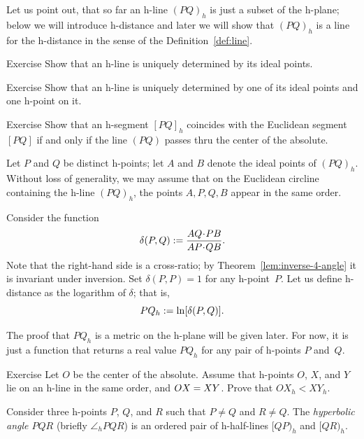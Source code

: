 Let us point out, that so far an h-line $(PQ)_h$ is just a subset of the h-plane;
below we will introduce h-distance 
and later we will show that $(PQ)_h$ is a line for the h-distance in the sense of the Definition~\ref{def:line}. 

\begin{thm}{Exercise}\label{ex:ideal-line-unique}
Show that an h-line is uniquely determined by its ideal points.
\end{thm}

\begin{thm}{Exercise}\label{ex:1ideal-line-unique}
Show that an h-line is uniquely determined by one of its ideal points and one h-point on it.
\end{thm}

\begin{thm}{Exercise}\label{ex:line/h-line}
Show that an h-segment $[PQ]_h$ coincides with the Euclidean segment $[PQ]$
if and only if the line $(PQ)$ passes thru the center of the absolute.
\end{thm}

\label{h-dist}
Let $P$ and $Q$ be distinct h-points;
let $A$ and $B$ denote the ideal points of $(PQ)_h$.
Without loss of generality, we may assume that on the Euclidean circline containing the h-line $(PQ)_h$, the points $A,P,Q,B$ appear in the same order.

Consider the function 
$$\delta(P,Q)\df\frac{AQ\cdot PB}{AP\cdot QB}.$$
Note that the right-hand side is a cross-ratio;
by Theorem~\ref{lem:inverse-4-angle} it is invariant under inversion.
Set $\delta(P,P)=1$ for any h-point~$P$.
Let us define h-distance as the logarithm of $\delta$; that is,
$$PQ_h:=\ln[\delta(P,Q)].$$

The proof that $PQ_h$ is a metric on the h-plane will be given later.
For now, it is just a function that returns a real value $PQ_h$ for any pair of h-points $P$ and~$Q$.

\begin{thm}{Exercise}\label{ex:h-dist-eq}
Let $O$ be the center of the absolute.
Assume that h-points $O$, $X$, and $Y$ lie on an h-line in the same order, and $OX\z=XY$.
Prove that $OX_h<XY_h$.
\end{thm}


\label{h-angle measure}
Consider three h-points $P$, $Q$, and $R$
such that $P\ne Q$ and $R\ne Q$.
The \emph{hyperbolic angle $PQR$} (briefly $\angle_h PQR$) is an ordered pair of h-half-lines $[QP)_h$ and $[QR)_h$.

